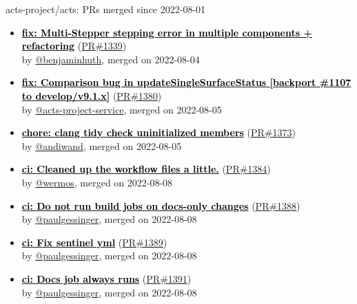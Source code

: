 \begin{frame}[allowframebreaks]{ acts-project/acts: PRs merged since 2022-08-01 }
\begin{itemize}
    \item
    \textbf{\href{https://github.com/acts-project/acts/pull/1339}{\textcolor{black}{fix: Multi-Stepper stepping error in multiple components + refactoring}}}
    (\href{https://github.com/acts-project/acts/pull/1339}{PR\#1339}) \\
    by \href{https://github.com/benjaminhuth}{ @benjaminhuth}, merged on 2022-08-04

    \item
    \textbf{\href{https://github.com/acts-project/acts/pull/1380}{\textcolor{black}{fix: Comparison bug in updateSingleSurfaceStatus [backport \#1107 to develop/v9.1.x]}}}
    (\href{https://github.com/acts-project/acts/pull/1380}{PR\#1380}) \\
    by \href{https://github.com/acts-project-service}{ @acts-project-service}, merged on 2022-08-05

    \item
    \textbf{\href{https://github.com/acts-project/acts/pull/1373}{\textcolor{black}{chore: clang tidy check uninitialized members}}}
    (\href{https://github.com/acts-project/acts/pull/1373}{PR\#1373}) \\
    by \href{https://github.com/andiwand}{ @andiwand}, merged on 2022-08-05

    \item
    \textbf{\href{https://github.com/acts-project/acts/pull/1384}{\textcolor{black}{ci: Cleaned up the workflow files a little.}}}
    (\href{https://github.com/acts-project/acts/pull/1384}{PR\#1384}) \\
    by \href{https://github.com/wermos}{ @wermos}, merged on 2022-08-08

    \item
    \textbf{\href{https://github.com/acts-project/acts/pull/1388}{\textcolor{black}{ci: Do not run build jobs on docs-only changes}}}
    (\href{https://github.com/acts-project/acts/pull/1388}{PR\#1388}) \\
    by \href{https://github.com/paulgessinger}{ @paulgessinger}, merged on 2022-08-08

    \item
    \textbf{\href{https://github.com/acts-project/acts/pull/1389}{\textcolor{black}{ci: Fix sentinel yml}}}
    (\href{https://github.com/acts-project/acts/pull/1389}{PR\#1389}) \\
    by \href{https://github.com/paulgessinger}{ @paulgessinger}, merged on 2022-08-08

    \item
    \textbf{\href{https://github.com/acts-project/acts/pull/1391}{\textcolor{black}{ci: Docs job always runs}}}
    (\href{https://github.com/acts-project/acts/pull/1391}{PR\#1391}) \\
    by \href{https://github.com/paulgessinger}{ @paulgessinger}, merged on 2022-08-08


\end{itemize}
\end{frame}

